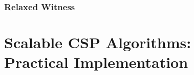\documentclass[screen,sigconf,anonymous,review]{acmart}
\begin{document}
\subsubsection{Relaxed Witness}
\label{sec:relaxed_witness}


\section{Scalable CSP Algorithms: \texorpdfstring{\\}{ } Practical Implementation}
\label{sec:numeric}





\clearpage

 

%
%
%
%
%
%
%
%
\end{document}
